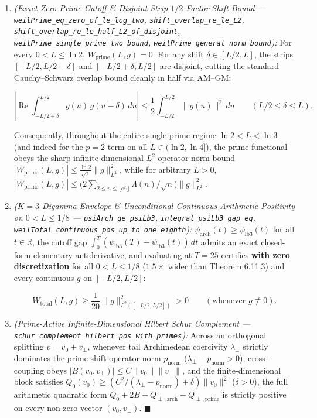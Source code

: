 \documentclass[
  11pt,
]{article}
\begin{document}
\begin{enumerate}
\def\labelenumi{\arabic{enumi}.}
\item
  \emph{(Exact Zero-Prime Cutoff \& Disjoint-Strip \(1/2\)-Factor Shift
  Bound --- \texttt{weilPrime\_eq\_zero\_of\_le\_log\_two},
  \texttt{shift\_overlap\_re\_le\_L2},
  \texttt{shift\_overlap\_re\_le\_half\_L2\_of\_disjoint},
  \texttt{weilPrime\_single\_prime\_two\_bound},
  \texttt{weilPrime\_general\_norm\_bound}):} For every
  \(0 < L \le \ln 2\), \(W_{\text{prime}}(L, g) = 0\). For any shift
  \(\delta \in [L/2, L]\), the strips \([-L/2, L/2 - \delta]\) and
  \([-L/2 + \delta, L/2]\) are disjoint, cutting the standard
  Cauchy--Schwarz overlap bound cleanly in half via AM--GM:

  \[\left|\operatorname{Re}\int_{-L/2 + \delta}^{L/2} g(u)\,\overline{g(u - \delta)}\,du\right| \le \frac{1}{2}\int_{-L/2}^{L/2} \|g(u)\|^2\,du \qquad (L/2 \le \delta \le L).\]

  Consequently, throughout the entire single-prime regime
  \(\ln 2 < L < \ln 3\) (and indeed for the \(p = 2\) term on all
  \(L \in (\ln 2, \ln 4]\)), the prime functional obeys the sharp
  infinite-dimensional \(L^2\) operator norm bound
  \(|W_{\text{prime}}(L, g)| \le \frac{\ln 2}{\sqrt{2}}\|g\|_{L^2}^2\),
  while for arbitrary \(L > 0\),
  \(|W_{\text{prime}}(L, g)| \le \big(2\sum_{2 \le n \le \lfloor e^L \rfloor} \Lambda(n)/\sqrt{n}\big)\|g\|_{L^2}^2\).
\item
  \emph{(\(K = 3\) Digamma Envelope \& Unconditional Continuous
  Arithmetic Positivity on \(0 < L \le 1/8\) ---
  \texttt{psiArch\_ge\_psiLb3}, \texttt{integral\_psiLb3\_gap\_eq},
  \texttt{weilTotal\_continuous\_pos\_up\_to\_one\_eighth}):}
  \(\psi_{\text{arch}}(t) \ge \psi_{\text{lb}3}(t)\) for all
  \(t \in \mathbb{R}\), the cutoff gap
  \(\int_0^T (\psi_{\text{lb}3}(T) - \psi_{\text{lb}3}(t))\,dt\) admits
  an exact closed-form elementary antiderivative, and evaluating at
  \(T = 25\) certifies \textbf{with zero discretization} for all
  \(0 < L \le 1/8\) (\(1.5\times\) wider than Theorem 6.11.3) and every
  continuous \(g\) on \([-L/2, L/2]\):

  \[W_{\text{total}}(L, g) \ge \frac{1}{20}\,\|g\|_{L^2([-L/2, L/2])}^2 > 0 \qquad (\text{whenever } g \not\equiv 0).\]
\item
  \emph{(Prime-Active Infinite-Dimensional Hilbert Schur Complement ---
  \texttt{schur\_complement\_hilbert\_pos\_with\_primes}):} Across an
  orthogonal splitting \(v = v_0 + v_\perp\), whenever tail Archimedean
  coercivity \(\lambda_\perp\) strictly dominates the prime-shift
  operator norm \(p_{\text{norm}}\)
  (\(\lambda_\perp - p_{\text{norm}} > 0\)), cross-coupling obeys
  \(|B(v_0, v_\perp)| \le C\|v_0\|\|v_\perp\|\), and the
  finite-dimensional block satisfies
  \(Q_0(v_0) \ge (C^2/(\lambda_\perp - p_{\text{norm}}) + \delta)\|v_0\|^2\)
  (\(\delta > 0\)), the full arithmetic quadratic form
  \(Q_0 + 2B + Q_{\perp,\text{arch}} - Q_{\perp,\text{prime}}\) is
  strictly positive on every non-zero vector \((v_0, v_\perp)\).
  \(\blacksquare\)
\end{enumerate}
\end{document}
